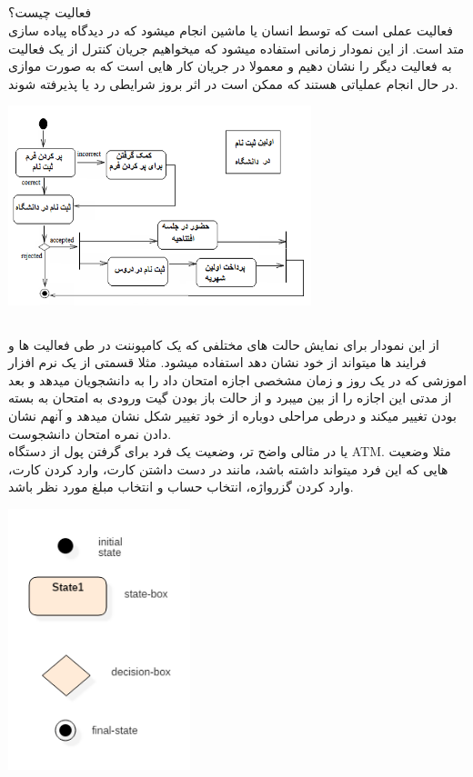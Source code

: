 \documentclass[22pt, a4]{article}
\begin{document}
\subsection{}
فعالیت چیست؟\\
فعالیت عملی است که توسط انسان یا ماشین انجام میشود که در دیدگاه پیاده سازی متد است.
از این نمودار زمانی استفاده میشود که میخواهیم جریان کنترل از یک فعالیت به فعالیت دیگر را نشان دهیم و معمولا در جریان کار هایی است که به صورت موازی در حال انجام عملیاتی هستند که ممکن است در اثر بروز شرایطی رد یا پذیرفته شوند.
\\
{\par\center\includegraphics[width=250pt]{img/activity_diagram.png}\par}

\newpage

\newpage
\subsection{}

از این نمودار برای نمایش حالت های مختلفی که یک کامپوننت در طی فعالیت ها و فرایند ها میتواند از خود نشان دهد استفاده میشود.
مثلا قسمتی از یک نرم افزار اموزشی که در یک روز و زمان مشخصی اجازه امتحان داد را به دانشجویان میدهد و بعد از مدتی این اجازه را از بین میبرد و از حالت باز بودن گیت ورودی به امتحان به بسته بودن تغییر میکند و  درطی مراحلی دوباره
از خود تغییر شکل نشان میدهد و آنهم نشان دادن نمره امتحان دانشجوست.\\

یا در مثالی واضح تر، وضعیت یک فرد برای گرفتن پول از دستگاه ATM.
مثلا وضعیت هایی که این فرد میتواند داشته باشد، مانند در دست داشتن کارت،
وارد کردن کارت، 
وارد کردن گزرواژه،
انتخاب حساب و انتخاب مبلغ مورد نظر باشد.

{\par\center\includegraphics[width=150pt]{img/08-041519_1219_UMLNotation10.png}\par}
\end{document}
